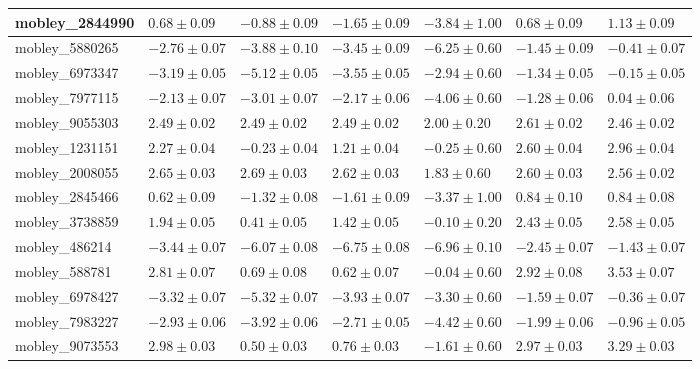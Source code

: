 \documentclass{article}
\begin{document}
\begin{landscape}
\begin{longtable}{|l{3.0cm}|l{3.0cm}|l{3.2cm}|l{3.6cm}|l{3.0cm}|l{3.0cm}|l{3.0cm}|}
mobley\_2844990	&	$	0.68	\pm	0.09	$	&	$	-0.88	\pm	0.09	$	&	$	-1.65	\pm	0.09	$	&	$	-3.84	\pm	1.00	$	&	$	0.68	\pm	0.09	$	&	$	1.13	\pm	0.09	$	\\ \hline
mobley\_5880265	&	$	-2.76	\pm	0.07	$	&	$	-3.88	\pm	0.10	$	&	$	-3.45	\pm	0.09	$	&	$	-6.25	\pm	0.60	$	&	$	-1.45	\pm	0.09	$	&	$	-0.41	\pm	0.07	$	\\ \hline
mobley\_6973347	&	$	-3.19	\pm	0.05	$	&	$	-5.12	\pm	0.05	$	&	$	-3.55	\pm	0.05	$	&	$	-2.94	\pm	0.60	$	&	$	-1.34	\pm	0.05	$	&	$	-0.15	\pm	0.05	$	\\ \hline
mobley\_7977115	&	$	-2.13	\pm	0.07	$	&	$	-3.01	\pm	0.07	$	&	$	-2.17	\pm	0.06	$	&	$	-4.06	\pm	0.60	$	&	$	-1.28	\pm	0.06	$	&	$	0.04	\pm	0.06	$	\\ \hline
mobley\_9055303	&	$	2.49	\pm	0.02	$	&	$	2.49	\pm	0.02	$	&	$	2.49	\pm	0.02	$	&	$	2.00	\pm	0.20	$	&	$	2.61	\pm	0.02	$	&	$	2.46	\pm	0.02	$	\\ \hline
mobley\_1231151	&	$	2.27	\pm	0.04	$	&	$	-0.23	\pm	0.04	$	&	$	1.21	\pm	0.04	$	&	$	-0.25	\pm	0.60	$	&	$	2.60	\pm	0.04	$	&	$	2.96	\pm	0.04	$	\\ \hline
mobley\_2008055	&	$	2.65	\pm	0.03	$	&	$	2.69	\pm	0.03	$	&	$	2.62	\pm	0.03	$	&	$	1.83	\pm	0.60	$	&	$	2.60	\pm	0.03	$	&	$	2.56	\pm	0.02	$	\\ \hline
mobley\_2845466	&	$	0.62	\pm	0.09	$	&	$	-1.32	\pm	0.08	$	&	$	-1.61	\pm	0.09	$	&	$	-3.37	\pm	1.00	$	&	$	0.84	\pm	0.10	$	&	$	0.84	\pm	0.08	$	\\ \hline
mobley\_3738859	&	$	1.94	\pm	0.05	$	&	$	0.41	\pm	0.05	$	&	$	1.42	\pm	0.05	$	&	$	-0.10	\pm	0.20	$	&	$	2.43	\pm	0.05	$	&	$	2.58	\pm	0.05	$	\\ \hline
mobley\_486214	&	$	-3.44	\pm	0.07	$	&	$	-6.07	\pm	0.08	$	&	$	-6.75	\pm	0.08	$	&	$	-6.96	\pm	0.10	$	&	$	-2.45	\pm	0.07	$	&	$	-1.43	\pm	0.07	$	\\ \hline
mobley\_588781	&	$	2.81	\pm	0.07	$	&	$	0.69	\pm	0.08	$	&	$	0.62	\pm	0.07	$	&	$	-0.04	\pm	0.60	$	&	$	2.92	\pm	0.08	$	&	$	3.53	\pm	0.07	$	\\ \hline
mobley\_6978427	&	$	-3.32	\pm	0.07	$	&	$	-5.32	\pm	0.07	$	&	$	-3.93	\pm	0.07	$	&	$	-3.30	\pm	0.60	$	&	$	-1.59	\pm	0.07	$	&	$	-0.36	\pm	0.07	$	\\ \hline
mobley\_7983227	&	$	-2.93	\pm	0.06	$	&	$	-3.92	\pm	0.06	$	&	$	-2.71	\pm	0.05	$	&	$	-4.42	\pm	0.60	$	&	$	-1.99	\pm	0.06	$	&	$	-0.96	\pm	0.05	$	\\ \hline
mobley\_9073553	&	$	2.98	\pm	0.03	$	&	$	0.50	\pm	0.03	$	&	$	0.76	\pm	0.03	$	&	$	-1.61	\pm	0.60	$	&	$	2.97	\pm	0.03	$	&	$	3.29	\pm	0.03	$	\\ \hline

\end{longtable}
\end{landscape}
\end{document}
